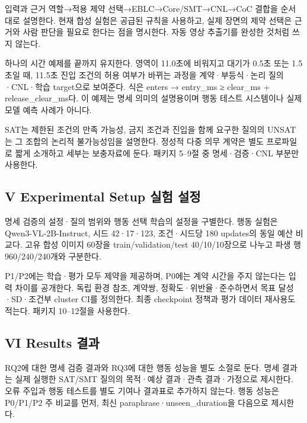 \documentclass[11pt,a4paper]{article}
\begin{document}
입력과 근거 역할→적용 제약 선택→EBLC→Core/SMT→CNL→CoC 결합을 순서대로 설명한다. 현재 합성 실험은 공급된 규칙을 사용하고, 실제 장면의 제약 선택은 근거와 사람 판단을 필요로 한다는 점을 명시한다. 자동 영상 추출기를 완성한 것처럼 쓰지 않는다.\par

하나의 시간 예제를 끝까지 유지한다. 영역이 11.0초에 비워지고 대기가 0.5초 또는 1.5초일 때, 11.5초 진입 조건의 허용 여부가 바뀌는 과정을 계약·부등식·논리 질의·CNL·학습 target으로 보여준다. 식은 enters → entry\_\allowbreak{}ms ≥ clear\_\allowbreak{}ms + release\_\allowbreak{}clear\_\allowbreak{}ms다. 이 예제는 명세 의미의 설명용이며 행동 테스트 시스템이나 실제 모델 예측 사례가 아니다.\par

SAT는 제한된 조건의 만족 가능성, 금지 조건과 진입을 함께 요구한 질의의 UNSAT는 그 조합의 논리적 불가능성임을 설명한다. 정성적 다중 의무 계약은 별도 프로파일로 짧게 소개하고 세부는 보충자료에 둔다. 패키지 5–9절 중 명세·검증·CNL 부분만 사용한다.\par

\subsection*{V Experimental Setup 실험 설정}

명세 검증의 설정·질의 범위와 행동 선택 학습의 설정을 구별한다. 행동 실험은 Qwen3-VL-2B-Instruct, 시드 42·17·123, 조건·시드당 180 updates의 동일 예산 비교다. 고유 합성 이미지 60장을 train/validation/test 40/10/10장으로 나누고 파생 행 960/240/240개와 구분한다.\par

P1/P2에는 학습·평가 모두 제약을 제공하며, P0에는 계약 시간을 주지 않는다는 입력 차이를 공개한다. 독립 환경 참조, 계약쌍, 정확도·위반율·준수하면서 목표 달성·SD·조건부 cluster CI를 정의한다. 최종 checkpoint 정책과 평가 데이터 재사용도 적는다. 패키지 10–12절을 사용한다.\par

\subsection*{VI Results 결과}

RQ2에 대한 명세 검증 결과와 RQ3에 대한 행동 성능을 별도 소절로 둔다. 명세 결과는 실제 실행한 SAT/SMT 질의의 목적·예상 결과·관측 결과·가정으로 제시한다. 오류 주입과 행동 테스트를 별도 기여나 결과표로 추가하지 않는다. 행동 성능은 P0/P1/P2 주 비교를 먼저, 최신 paraphrase·unseen\_\allowbreak{}duration을 다음으로 제시한다.\par
\end{document}

